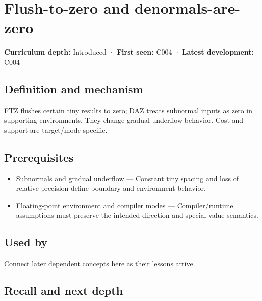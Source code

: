\hypertarget{appendix-e979eb012782}{}\label{referencestart:appendix-e979eb012782}
\section{Flush-to-zero and denormals-are-zero}\label{appendix-e979eb012782-flush-to-zero-and-denormals-are-zero}

\textbf{Curriculum depth:} Introduced · \textbf{First seen:} C004 · \textbf{Latest development:} C004

\begin{allmightroledefinition}

\subsection{Definition and mechanism}\label{appendix-e979eb012782-definition-and-mechanism}

FTZ flushes certain tiny results to zero; DAZ treats subnormal inputs as zero in supporting environments. They change gradual-underflow behavior. Cost and support are target/mode-specific.

\end{allmightroledefinition}

\subsection{Prerequisites}\label{appendix-e979eb012782-prerequisites}

\begin{itemize}
\tightlist
\item
  \hyperref[appendix-00a6e044c437]{Subnormals and gradual underflow} --- Constant tiny spacing and loss of relative precision define boundary and environment behavior.
\item
  \hyperref[appendix-f11d1a521253]{Floating-point environment and compiler modes} --- Compiler/runtime assumptions must preserve the intended direction and special-value semantics.
\end{itemize}

\subsection{Used by}\label{appendix-e979eb012782-used-by}

Connect later dependent concepts here as their lessons arrive.

\subsection{Recall and next depth}\label{appendix-e979eb012782-recall-and-next-depth}

